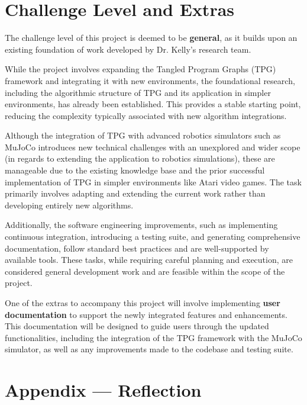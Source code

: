 \documentclass{article}
\begin{document}
\section{Challenge Level and Extras}

The challenge level of this project is deemed to be \textbf{general}, as it builds upon an existing foundation of work developed by Dr. Kelly’s research team.

While the project involves expanding the Tangled Program Graphs (TPG) framework and integrating it with new environments, the foundational research, including the algorithmic structure of TPG and its application in simpler environments, has already been established. This provides a stable starting point, reducing the complexity typically associated with new algorithm integrations.

Although the integration of TPG with advanced robotics simulators such as MuJoCo introduces new technical challenges with an unexplored and wider scope (in regards to extending the application to robotics simulations), these are manageable due to the existing knowledge base and the prior successful implementation of TPG in simpler environments like Atari video games. The task primarily involves adapting and extending the current work rather than developing entirely new algorithms.

Additionally, the software engineering improvements, such as implementing continuous integration, introducing a testing suite, and generating comprehensive documentation, follow standard best practices and are well-supported by available tools. These tasks, while requiring careful planning and execution, are considered general development work and are feasible within the scope of the project.

One of the extras to accompany this project will involve implementing \textbf{user documentation} to support the newly integrated features and enhancements. This documentation will be designed to guide users through the updated functionalities, including the integration of the TPG framework with the MuJoCo simulator, as well as any improvements made to the codebase and testing suite.

\newpage{}

\section*{Appendix --- Reflection}


\end{document}
